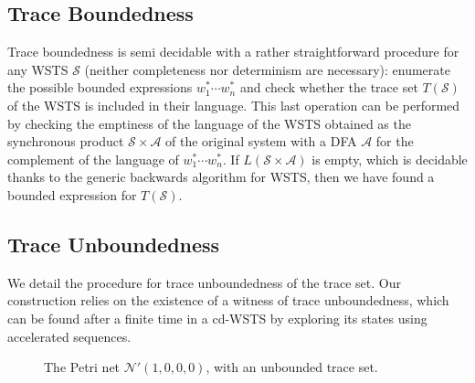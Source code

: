 \documentclass[11pt,reqno,a4paper]{amsart}
\theoremstyle{plain}
\theoremstyle{definition}
\theoremstyle{remark}
\begin{document}
\subsection{Trace Boundedness}
Trace boundedness is semi decidable with a
rather straightforward procedure for any WSTS $\mathcal{S}$ (neither
completeness nor determinism are necessary): enumerate the possible bounded
expressions $w_1^\ast\cdots w_n^\ast$ and check whether the trace set
$T(\mathcal{S})$ of the WSTS is included in their language.
This last operation can be performed by checking the emptiness of the
language of the WSTS obtained as the synchronous product
$\mathcal{S}\times\mathcal{A}$ of the original
system with a DFA $\mathcal{A}$ for the complement of the language of
$w_1^\ast\cdots w_n^\ast$.  If $L(\mathcal{S}\times\mathcal{A})$ is
empty, which is decidable thanks to the generic backwards algorithm for
WSTS, then we have found a bounded expression for $T(\mathcal{S})$.

\subsection{Trace Unboundedness}\label{sub:dec}
We detail the procedure for trace unboundedness of the trace set.  Our
construction relies on the existence of a witness of trace
unboundedness, which can be found after a finite time in a cd-WSTS by
exploring its states using accelerated sequences.
\begin{figure}[tb]
  \centering
  \caption{\label{fig:unb}The Petri net $\mathcal{N}'(1,0,0,0)$, with an unbounded trace set.}
\end{figure}
\end{document}

